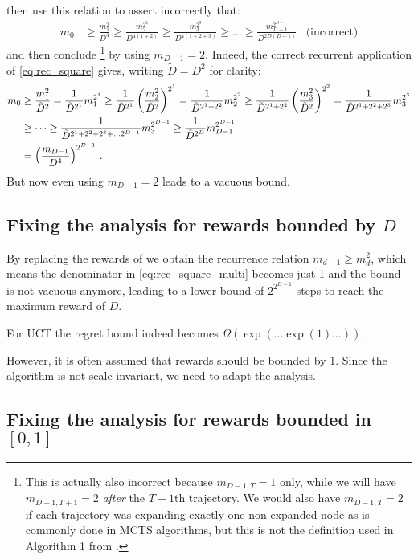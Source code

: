 \documentclass[a4paper]{article}
\begin{document}
\iffalse
\citet{coquelin2007bandit} then use this relation to assert incorrectly that:
\begin{align}
    m_0 
    &\geq \frac{m_1^2}{D^4}
    \geq \frac{m_2^{2^2}}{D^{4(1+2)}}
    \geq \frac{m_3^{2^3}}{D^{4(1+2+3)}}
    \geq \dots
    \geq \frac{m_{D-1}^{2^{D-1}}}{D^{2D(D-1)}}
    &\text{(incorrect)}
\end{align}
and then conclude
\footnote{This is actually also incorrect because $m_{D-1,T} =1$ only, while we will have $m_{D-1,T+1}=2$ \emph{after} the $T+1$th trajectory. We would also have $m_{D-1,T} =2$ if each trajectory was expanding exactly one non-expanded node as is commonly done in MCTS algorithms, but this is not the definition used in Algorithm 1 from \citet{coquelin2007bandit}.}
by using $m_{D-1} = 2$.
Indeed, the correct recurrent application of \cref{eq:rec_square} gives,
writing $\tilde D = D^2$ for clarity:
\begin{align}
    m_0 
    &\geq \frac{m_1^2}{\tilde D^2} 
    = \frac1{\tilde D^{2^1}}m_1^{2^1}
    \geq \frac1{\tilde D^{2^1}}\left(\frac{m_2^2}{\tilde D^2}\right)^{2^1}
    = \frac1{\tilde D^{2^1+2^2}}m_2^{2^2}
    \geq \frac1{\tilde D^{2^1+2^2}}\left(\frac{m_3^2}{\tilde D^2}\right)^{2^2}
    = \frac1{\tilde D^{2^1+2^2+2^3}}m_3^{2^3} \notag\\
    &\geq \dots
    \geq \frac1{\tilde D^{2^1+2^2+2^3+\dots 2^{D-1}}}m_3^{2^{D-1}}
    \geq \frac1{\tilde D^{2^D}}m_{D-1}^{2^{D-1}} \notag\\
    &= \left(\frac{m_{D-1}}{D^4}\right)^{2^{D-1}}\,.
    \label{eq:rec_square_multi}
\end{align}
But now even using $m_{D-1}= 2$ leads to a vacuous bound.
\subsection{Fixing the analysis for rewards bounded by $D$}

By replacing the rewards of
we obtain the recurrence relation $m_{d-1} \geq m_d^2$, which means the denominator in \cref{eq:rec_square_multi} becomes just 1 and the bound is not vacuous anymore,
leading to a lower bound of $2^{2^{D-1}}$ steps to reach the maximum reward of $D$.

For UCT the regret bound indeed becomes $\Omega(\exp(\dots \exp(1)\dots))$.

However, it is often assumed that rewards should be bounded by 1.
Since the algorithm is not scale-invariant, we need to adapt the analysis.

\subsection{Fixing the analysis for rewards bounded in $[0, 1]$}\label{sec:bounded_rewards}
\end{document}
